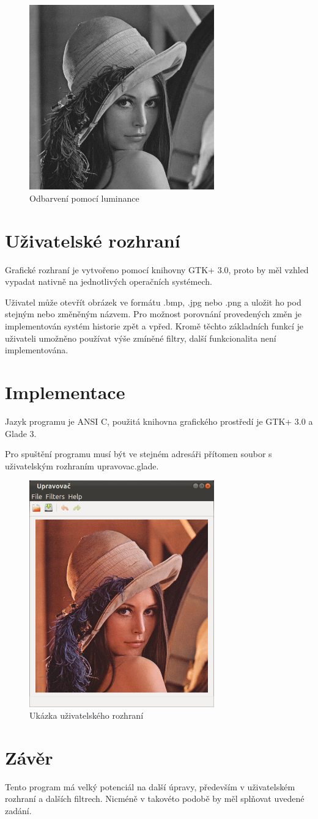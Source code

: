\documentclass[11pt]{article}
\begin{document}
\begin{figure}[ht!]
\centering
	\includegraphics[width=8cm]{luminance.png}
	\caption{Odbarvení pomocí luminance}
\end{figure}

\section{Uživatelské rozhraní}
Grafické rozhraní je vytvořeno pomocí knihovny GTK+ 3.0, proto by měl vzhled
vypadat nativně na jednotlivých operačních systémech.

Uživatel může otevřít obrázek ve formátu .bmp, .jpg nebo .png a uložit ho pod
stejným nebo změněným názvem. Pro možnost porovnání provedených změn je
implementován systém historie zpět a vpřed. Kromě těchto základních funkcí je
uživateli umožněno používat výše zmíněné filtry, další funkcionalita není
implementována.

\section{Implementace}
Jazyk programu je ANSI C, použitá knihovna grafického prostředí je GTK+ 3.0 a
Glade 3.

Pro spuštění programu musí být ve stejném adresáři přítomen soubor s
uživatelským rozhraním upravovac.glade.

\begin{figure}[ht!]
\centering
	\includegraphics[width=8cm]{gui.png}
	\caption{Ukázka uživatelského rozhraní}
\end{figure}

\section{Závěr}
Tento program má velký potenciál na další úpravy, především v uživatelském
rozhraní a dalších filtrech. Nicméně v takovéto podobě by měl splňovat uvedené
zadání.
\end{document}
